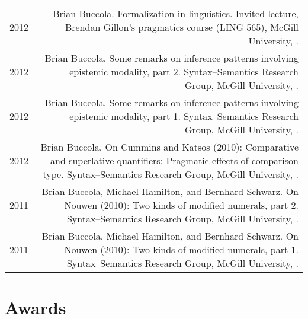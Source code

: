 \documentclass[letterpaper]{article}
\makeatletter
\newcommand{\name}{Brian Buccola}
\newcommand{\myvrule}{\color{lightgray}\vrule width 1.0pt}
\newenvironment{cvsection}{%
  \vspace{-3ex}
  \renewcommand{\arraystretch}{1.5}
  \begin{longtable}{@{} L R @{}}
}{%
  \end{longtable}
  \vspace{1ex}
  \renewcommand{\arraystretch}{1.0}
}
\makeatother
\begin{document}
\begin{cvsection}
  2012 & \name. Formalization in linguistics.  Invited lecture, Brendan
  Gillon's pragmatics course (LING 565), McGill University,
  . \\

  2012 & \name. Some remarks on inference patterns involving epistemic
  modality, part 2. Syntax--Semantics Research Group, McGill University,
  . \\

  2012 & \name. Some remarks on inference patterns involving epistemic
  modality, part 1. Syntax--Semantics Research Group, McGill University,
  . \\

  2012 & \name. On Cummins and Katsos (2010): Comparative and superlative
  quantifiers: Pragmatic effects of comparison type. Syntax--Semantics Research
  Group, McGill University, . \\

  2011 & \name, Michael Hamilton, and Bernhard Schwarz. On Nouwen (2010): Two
  kinds of modified numerals, part 2. Syntax--Semantics Research Group, McGill
  University, . \\

  2011 & \name, Michael Hamilton, and Bernhard Schwarz. On Nouwen (2010): Two
  kinds of modified numerals, part 1. Syntax--Semantics Research Group, McGill
  University, .
\end{cvsection}



\section*{Awards}
\end{document}
